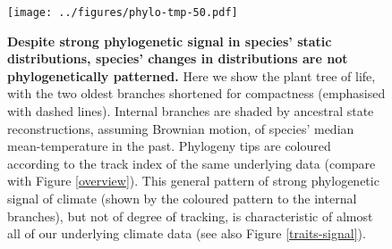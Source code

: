 \documentclass[12pt]{report}
\begin{document}
\clearpage
\begin{landscape}
\begin{figure}[h!]
  \begin{center}
    \texttt{[image: ../figures/phylo-tmp-50.pdf]}
  \end{center}
  \caption{\textbf{Despite strong phylogenetic signal in species'
      static distributions, species' changes in distributions are not
      phylogenetically patterned.} Here we show the plant tree of
    life, with the two oldest branches shortened for compactness
    (emphasised with dashed lines). Internal branches are shaded by
    ancestral state reconstructions, assuming Brownian motion, of
    species' median mean-temperature in the past. Phylogeny tips are
    coloured according to the track index of the same underlying data
    (compare with Figure \ref{overview}). This general pattern of
    strong phylogenetic signal of climate (shown by the coloured
    pattern to the internal branches), but not of degree of tracking,
    is characteristic of almost all of our underlying climate data
    (see also Figure \ref{traits-signal}).}
  \label{phylo}
\end{figure}
\end{landscape}
\end{document}
